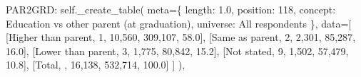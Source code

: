 \documentclass[
  11pt,
  a4paper,
]{article}
\newenvironment{Shaded}{\begin{snugshade}}{\end{snugshade}}
\newcommand{\NormalTok}[1]{\textcolor[rgb]{0.00,0.23,0.31}{#1}}
\newcommand{\OperatorTok}[1]{\textcolor[rgb]{0.37,0.37,0.37}{#1}}
\newcommand{\StringTok}[1]{\textcolor[rgb]{0.13,0.47,0.30}{#1}}
\newcommand{\VariableTok}[1]{\textcolor[rgb]{0.07,0.07,0.07}{#1}}
\begin{document}
\begin{Shaded}
\begin{Highlighting}[]
    \StringTok{\textquotesingle{}PAR2GRD\textquotesingle{}}\NormalTok{: }\VariableTok{self}\NormalTok{.\_create\_table(}
\NormalTok{        meta}\OperatorTok{=}\NormalTok{\{}
            \StringTok{\textquotesingle{}length\textquotesingle{}}\NormalTok{: }\StringTok{\textquotesingle{}1.0\textquotesingle{}}\NormalTok{, }\StringTok{\textquotesingle{}position\textquotesingle{}}\NormalTok{: }\StringTok{\textquotesingle{}118\textquotesingle{}}\NormalTok{,}
            \StringTok{\textquotesingle{}concept\textquotesingle{}}\NormalTok{: }\StringTok{\textquotesingle{}Education vs other parent (at graduation)\textquotesingle{}}\NormalTok{,}
            \StringTok{\textquotesingle{}universe\textquotesingle{}}\NormalTok{: }\StringTok{\textquotesingle{}All respondents\textquotesingle{}}
\NormalTok{        \},}
\NormalTok{        data}\OperatorTok{=}\NormalTok{[}
\NormalTok{            [}\StringTok{\textquotesingle{}Higher than parent\textquotesingle{}}\NormalTok{, }\StringTok{\textquotesingle{}1\textquotesingle{}}\NormalTok{, }\StringTok{\textquotesingle{}10,560\textquotesingle{}}\NormalTok{, }\StringTok{\textquotesingle{}309,107\textquotesingle{}}\NormalTok{, }\StringTok{\textquotesingle{}58.0\textquotesingle{}}\NormalTok{],}
\NormalTok{            [}\StringTok{\textquotesingle{}Same as parent\textquotesingle{}}\NormalTok{, }\StringTok{\textquotesingle{}2\textquotesingle{}}\NormalTok{, }\StringTok{\textquotesingle{}2,301\textquotesingle{}}\NormalTok{, }\StringTok{\textquotesingle{}85,287\textquotesingle{}}\NormalTok{, }\StringTok{\textquotesingle{}16.0\textquotesingle{}}\NormalTok{],}
\NormalTok{            [}\StringTok{\textquotesingle{}Lower than parent\textquotesingle{}}\NormalTok{, }\StringTok{\textquotesingle{}3\textquotesingle{}}\NormalTok{, }\StringTok{\textquotesingle{}1,775\textquotesingle{}}\NormalTok{, }\StringTok{\textquotesingle{}80,842\textquotesingle{}}\NormalTok{, }\StringTok{\textquotesingle{}15.2\textquotesingle{}}\NormalTok{],}
\NormalTok{            [}\StringTok{\textquotesingle{}Not stated\textquotesingle{}}\NormalTok{, }\StringTok{\textquotesingle{}9\textquotesingle{}}\NormalTok{, }\StringTok{\textquotesingle{}1,502\textquotesingle{}}\NormalTok{, }\StringTok{\textquotesingle{}57,479\textquotesingle{}}\NormalTok{, }\StringTok{\textquotesingle{}10.8\textquotesingle{}}\NormalTok{],}
\NormalTok{            [}\StringTok{\textquotesingle{}Total\textquotesingle{}}\NormalTok{, }\StringTok{\textquotesingle{}\textquotesingle{}}\NormalTok{, }\StringTok{\textquotesingle{}16,138\textquotesingle{}}\NormalTok{, }\StringTok{\textquotesingle{}532,714\textquotesingle{}}\NormalTok{, }\StringTok{\textquotesingle{}100.0\textquotesingle{}}\NormalTok{]}
\NormalTok{        ]}
\NormalTok{    ),}


\end{Highlighting}
\end{Shaded}
\end{document}
